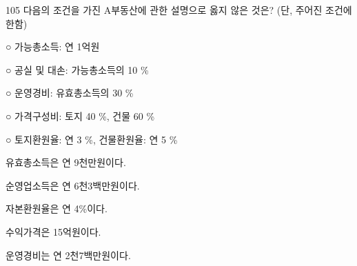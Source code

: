\begin{question}{105}
다음의 조건을 가진 A부동산에 관한 설명으로 옳지 않은 것은? (단, 주어진 조건에 한함)
\begin{framedtext}
○ 가능총소득: 연 1억원 \par
○ 공실 및 대손: 가능총소득의 10 \% \par
○ 운영경비: 유효총소득의 30 \% \par
○ 가격구성비: 토지 40 \%, 건물 60 \% \par
○ 토지환원율: 연 3 \%, 건물환원율: 연 5 \%
\end{framedtext}
\begin{choices}
  \item 유효총소득은 연 9천만원이다.
  \item 순영업소득은 연 6천3백만원이다.
  \item 자본환원율은 연 4\%이다.
  \item 수익가격은 15억원이다.
  \item 운영경비는 연 2천7백만원이다.
\end{choices}
\end{question}
